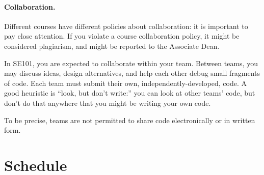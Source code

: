 \documentclass[11pt,onecolumn]{article}
\begin{document}
\paragraph{Collaboration.} Different courses have different policies
about collaboration: it is important to pay close attention. If you
violate a course collaboration policy, it might be considered
plagiarism, and might be reported to the Associate Dean.

In SE101, you are expected to collaborate within your team. Between
teams, you may discuss ideas, design alternatives, and help each other
debug small fragments of code. Each team must submit their own,
independently-developed, code. A good heuristic is ``look, but don't
write:'' you can look at other teams' code, but don't do that anywhere
that you might be writing your own code.

To be precise, teams are not permitted to share code electronically
or in written form.



\section{Schedule}
\end{document}
